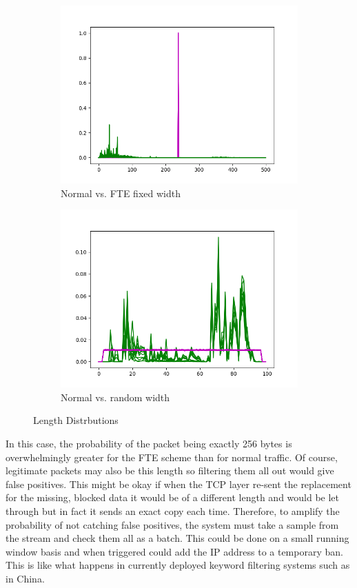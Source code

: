 \documentclass[ %
                    author={Samuel Russell},
                supervisor={Prof. Bogdan Warinschi},
                    degree={MEng},
                     title={Innocuous Ciphertexts},
                  subtitle={The DE-CENSOR Scheme},
                      type={research},
                      year={2018} ]{dissertation}
\begin{document}
\begin{figure}[h]
\begin{subfigure}[b]{.49\linewidth}
\includegraphics[width=\linewidth]{fake_length_dist}
\caption{Normal vs. FTE fixed width}
\label{fig:fake_length_dist}
\end{subfigure}
\begin{subfigure}[b]{.49\linewidth}
\includegraphics[width=\linewidth]{uniform_length_dist}
\caption{Normal vs. random width}
\label{fig:uniform_length_dist}
\end{subfigure}
\caption{Length Distrbutions}
\end{figure}

In this case, the probability of the packet being exactly 256 bytes is overwhelmingly greater for the FTE scheme than for normal traffic.
Of course, legitimate packets may also be this length so filtering them all out would give false positives.
This might be okay if when the TCP layer re-sent the replacement for the missing, blocked data it would be of a different length and would be let through but in fact it sends an exact copy each time.
Therefore, to amplify the probability of not catching false positives, the system must take a sample from the stream and check them all as a batch.
This could be done on a small running window basis and when triggered could add the IP address to a temporary ban.
This is like what happens in currently deployed keyword filtering systems such as in China. 
\end{document}
